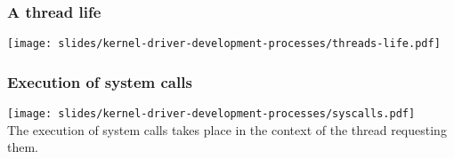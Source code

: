 \begin{frame}
  \frametitle{A thread life}
  \begin{center}
    \texttt{[image: slides/kernel-driver-development-processes/threads-life.pdf]}
  \end{center}
\end{frame}

\begin{frame}
  \frametitle{Execution of system calls}
  \begin{center}
    \texttt{[image: slides/kernel-driver-development-processes/syscalls.pdf]}\\
    The execution of system calls takes place in the context of the
    thread requesting them.
  \end{center}
\end{frame}

